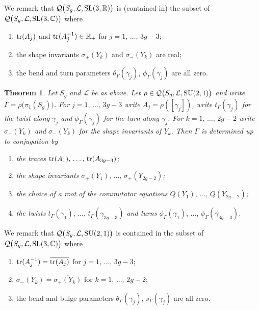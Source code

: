 \documentclass[11pt]{amsart}
\newtheorem{theorem}{Theorem}[section]
\numberwithin{equation}{section}
\begin{document}
We remark that ${\mathcal Q}\bigl(S_g,{\mathcal L},{\rm SL}(3,{\mathbb R})\bigr)$ is (contained in) the subset of
${\mathcal Q}\bigl(S_g,{\mathcal L},{\rm SL}(3,{\mathbb C})\bigr)$ where
\begin{enumerate}
\item[(1)] ${\rm tr}(A_j)$ and ${\rm tr}(A_j^{-1})\in{\mathbb R}_+$ for $j=1,\,\ldots,\,3g-3$;
\item[(2)] the shape invariants $\sigma_+(Y_k)$ and $\sigma_-(Y_k)$ are real;
\item[(3)] the bend and turn parameters $\theta_\Gamma(\gamma_j)$, $\phi_\Gamma(\gamma_j)$ are all zero.
\end{enumerate}

\begin{theorem}\label{thm:main-SU(2,1)}
Let $S_g$ and ${\mathcal L}$ be as above. Let $\rho\in{\mathcal Q}\bigl(S_g,{\mathcal L}, {\rm SU}(2,1)\bigr)$ and write 
$\Gamma=\rho\bigl(\pi_1(S_g)\bigr)$.
For $j=1,\,\ldots,\,3g-3$ write $A_j=\rho([\gamma_j])$, write $t_\Gamma(\gamma_j)$ 
for the twist along $\gamma_j$ and $\phi_\Gamma(\gamma_j)$ for the turn along $\gamma_j$.
For $k=1,\,\ldots,\,2g-2$ write $\sigma_+(Y_k)$ and $\sigma_-(Y_k)$ for the shape invariants of $Y_k$. 
Then $\Gamma$ is determined up to conjugation by
\begin{enumerate}
\item[(1)] the traces ${\rm tr}(A_1),\,\ldots,\,{\rm tr}(A_{3g-3})$; 
\item[(2)] the shape invariants $\sigma_+(Y_1),\,\ldots,\, \sigma_+(Y_{2g-2})$;
\item[(3)] the choice of a root of the commutator equations $Q(Y_1),\,\ldots,\,Q(Y_{2g-2})$; 
\item[(4)] the twists $t_\Gamma(\gamma_1),\,\ldots,\,t_\Gamma(\gamma_{3g-3})$
and turns $\phi_\Gamma(\gamma_1),\,\ldots,\,\phi_\Gamma(\gamma_{3g-3})$.
\end{enumerate}
\end{theorem}

We remark that ${\mathcal Q}\bigl(S_g,{\mathcal L},{\rm SU}(2,1)\bigr)$ is contained in the subset of
${\mathcal Q}\bigl(S_g,{\mathcal L},{\rm SL}(3,{\mathbb C})\bigr)$ where
\begin{enumerate}
\item[(1)] ${\rm tr}(A_j^{-1})=\overline{{\rm tr}(A_j)}$ for $j=1,\,\ldots,\,3g-3$;
\item[(2)] $\sigma_-(Y_k)=\overline{\sigma_+(Y_k)}$ for $k=1,\,\ldots,\,2g-2$;
\item[(3)] the bend and bulge parameters $\theta_\Gamma(\gamma_j)$, $s_\Gamma(\gamma_j)$ are all zero.
\end{enumerate}
\end{document}
